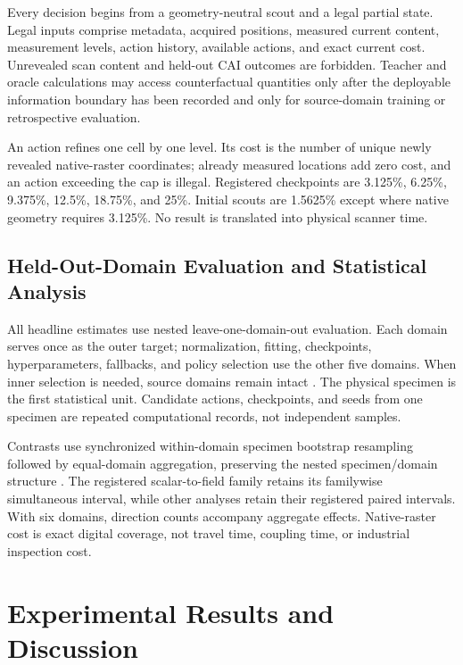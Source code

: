 \documentclass[preprint,12pt]{elsarticle}
\begin{document}
Every decision begins from a geometry-neutral scout and a legal partial state.
Legal inputs comprise metadata, acquired positions, measured current content,
measurement levels, action history, available actions, and exact current cost.
Unrevealed scan content and held-out CAI outcomes are forbidden. Teacher and
oracle calculations may access counterfactual quantities only after the
deployable information boundary has been recorded and only for source-domain
training or retrospective evaluation.

An action refines one cell by one level. Its cost is the number of unique newly
revealed native-raster coordinates; already measured locations add zero cost,
and an action exceeding the cap is illegal. Registered checkpoints are
3.125\%, 6.25\%, 9.375\%, 12.5\%, 18.75\%, and 25\%. Initial scouts are 1.5625\%
except where native geometry requires 3.125\%.
No result is translated into physical scanner time.

\subsection{Held-Out-Domain Evaluation and Statistical Analysis}
\label{sec:evaluation-statistics}

All headline estimates use nested leave-one-domain-out evaluation. Each domain
serves once as the outer target; normalization, fitting, checkpoints,
hyperparameters, fallbacks, and policy selection use the other five domains.
When inner selection is needed, source domains remain intact
\cite{varma2006bias,gulrajani2021domainbed}. The physical specimen is the first
statistical unit. Candidate actions, checkpoints, and seeds from one specimen
are repeated computational records, not independent samples.

Contrasts use synchronized within-domain specimen bootstrap resampling followed
by equal-domain aggregation, preserving the nested specimen/domain structure
\cite{huang2018cluster}. The registered scalar-to-field family retains its
familywise simultaneous interval, while other analyses retain their registered
paired intervals. With six domains, direction counts accompany aggregate
effects. Native-raster cost is exact digital coverage,
not travel time, coupling time, or industrial inspection cost.

\section{Experimental Results and Discussion}
\label{sec:results-discussion}
\end{document}
